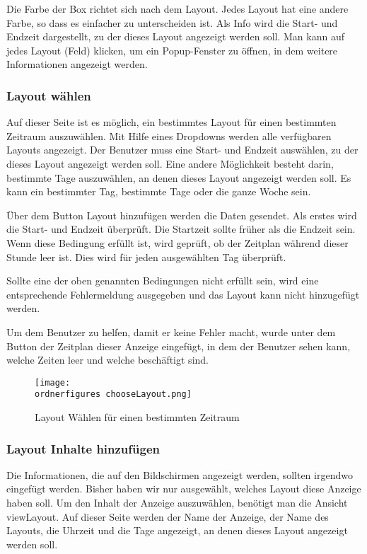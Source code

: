 Die Farbe der Box richtet sich nach dem Layout. Jedes Layout hat eine andere Farbe, so dass es einfacher zu unterscheiden ist.
Als Info wird die Start- und Endzeit dargestellt, zu der dieses Layout angezeigt werden soll. 
Man kann auf jedes Layout (Feld) klicken, um ein Popup-Fenster zu öffnen, in dem weitere Informationen angezeigt werden.

\subsubsection{Layout wählen}

Auf dieser Seite ist es möglich, ein bestimmtes Layout für einen bestimmten Zeitraum auszuwählen. Mit Hilfe eines Dropdowns werden alle verfügbaren Layouts angezeigt. Der Benutzer muss eine Start- und Endzeit auswählen, zu der dieses Layout angezeigt werden soll. Eine andere Möglichkeit besteht darin, bestimmte Tage auszuwählen, an denen dieses Layout angezeigt werden soll. Es kann ein bestimmter Tag, bestimmte Tage oder die ganze Woche sein.

Über dem Button Layout hinzufügen werden die Daten gesendet. Als erstes wird die Start- und Endzeit überprüft. Die Startzeit sollte früher als die Endzeit sein. Wenn diese Bedingung erfüllt ist, wird geprüft, ob der Zeitplan während dieser Stunde leer ist. Dies wird für jeden ausgewählten Tag überprüft.

Sollte eine der oben genannten Bedingungen nicht erfüllt sein, wird eine entsprechende Fehlermeldung ausgegeben und das Layout kann nicht hinzugefügt werden.

Um dem Benutzer zu helfen, damit er keine Fehler macht, wurde unter dem Button der Zeitplan 
dieser Anzeige eingefügt, in dem der Benutzer sehen kann, welche Zeiten leer und welche beschäftigt sind.

\begin{figure}[H]
	\centering
	\texttt{[image: \\ordnerfigures chooseLayout.png]}
	\caption{Layout Wählen für einen bestimmten Zeitraum}
	\label{fi:chooseLayout}
\end{figure}

\subsubsection{Layout Inhalte hinzufügen}
Die Informationen, die auf den Bildschirmen angezeigt werden, sollten irgendwo eingefügt werden. Bisher haben wir nur ausgewählt, welches Layout diese Anzeige haben soll.
Um den Inhalt der Anzeige auszuwählen, benötigt man die Ansicht viewLayout. Auf dieser Seite werden der Name der Anzeige, der Name des Layouts, die Uhrzeit und die Tage angezeigt, an denen dieses Layout angezeigt werden soll.

